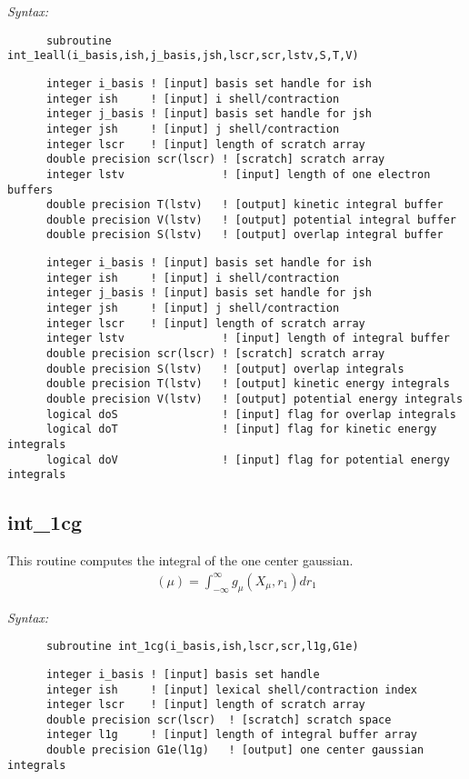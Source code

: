  
{\it Syntax:} 
\begin{verbatim}  
      subroutine int_1eall(i_basis,ish,j_basis,jsh,lscr,scr,lstv,S,T,V) 
\end{verbatim} 
\begin{verbatim} 
      integer i_basis ! [input] basis set handle for ish 
      integer ish     ! [input] i shell/contraction 
      integer j_basis ! [input] basis set handle for jsh 
      integer jsh     ! [input] j shell/contraction 
      integer lscr    ! [input] length of scratch array 
      double precision scr(lscr) ! [scratch] scratch array 
      integer lstv               ! [input] length of one electron buffers 
      double precision T(lstv)   ! [output] kinetic integral buffer 
      double precision V(lstv)   ! [output] potential integral buffer 
      double precision S(lstv)   ! [output] overlap integral buffer 
\end{verbatim} 
\begin{verbatim} 
      integer i_basis ! [input] basis set handle for ish 
      integer ish     ! [input] i shell/contraction 
      integer j_basis ! [input] basis set handle for jsh 
      integer jsh     ! [input] j shell/contraction 
      integer lscr    ! [input] length of scratch array 
      integer lstv               ! [input] length of integral buffer 
      double precision scr(lscr) ! [scratch] scratch array 
      double precision S(lstv)   ! [output] overlap integrals 
      double precision T(lstv)   ! [output] kinetic energy integrals 
      double precision V(lstv)   ! [output] potential energy integrals 
      logical doS                ! [input] flag for overlap integrals 
      logical doT                ! [input] flag for kinetic energy integrals 
      logical doV                ! [input] flag for potential energy integrals 
\end{verbatim} 
\subsection{int\_1cg} 
This routine computes the integral of the one center gaussian. 
\begin{eqnarray*} 
({\mu}) = \int_{-\infty}^{\infty} g_{\mu}(X_{\mu},r_{1})dr_{1} 
\end{eqnarray*} 
 
{\it Syntax:} 
\begin{verbatim} 
      subroutine int_1cg(i_basis,ish,lscr,scr,l1g,G1e) 
\end{verbatim} 
\begin{verbatim} 
      integer i_basis ! [input] basis set handle 
      integer ish     ! [input] lexical shell/contraction index 
      integer lscr    ! [input] length of scratch array 
      double precision scr(lscr)  ! [scratch] scratch space  
      integer l1g     ! [input] length of integral buffer array 
      double precision G1e(l1g)   ! [output] one center gaussian integrals 
\end{verbatim} 
